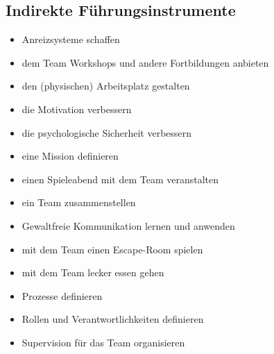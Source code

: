 \subsection{Indirekte Führungsinstrumente}

\begin{itemize}
    \item Anreizsysteme schaffen
    \item dem Team Workshops und andere Fortbildungen anbieten
    \item den (physischen) Arbeitsplatz gestalten
    \item die Motivation verbessern
    \item die psychologische Sicherheit verbessern
    \item eine Mission definieren
    \item einen Spieleabend mit dem Team veranstalten
    \item ein Team zusammenstellen
    \item Gewaltfreie Kommunikation lernen und anwenden
    \item mit dem Team einen Escape-Room spielen
    \item mit dem Team lecker essen gehen
    \item Prozesse definieren
    \item Rollen und Verantwortlichkeiten definieren
    \item Supervision für das Team organisieren
\end{itemize}
